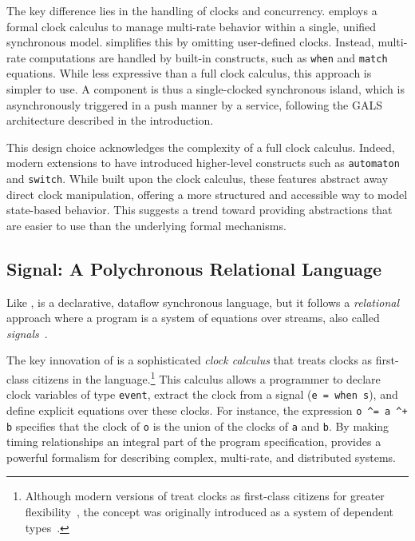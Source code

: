 The key difference lies in the handling of clocks and concurrency. \Lustre employs a formal clock
calculus to manage multi-rate behavior within a single, unified synchronous model. \GRSync
simplifies this by omitting user-defined clocks. Instead, multi-rate computations are handled by
built-in constructs, such as \texttt{when} and \texttt{match} equations. While less expressive than
a full clock calculus, this approach is simpler to use. A \GRSync component is thus a single-clocked
synchronous island, which is asynchronously triggered in a push manner by a \GRFRP service,
following the GALS architecture described in the introduction.

This design choice acknowledges the complexity of a full clock calculus. Indeed, modern extensions
to \Lustre have introduced higher-level constructs such as \texttt{automaton} and \texttt{switch}.
While built upon the clock calculus, these features abstract away direct clock manipulation,
offering a more structured and accessible way to model state-based behavior. This suggests a trend
toward providing abstractions that are easier to use than the underlying formal mechanisms.

\subsection{Signal: A Polychronous Relational Language}
\label{sec:sota:synchronous:signal}

Like \Lustre, \Signal is a declarative, dataflow synchronous language, but it follows a
\emph{relational} approach where a program is a system of equations over streams, also called
\emph{signals}~\cite{DBLP:journals/scp/BenvenisteGJ91}.

The key innovation of \Signal is a sophisticated \emph{clock calculus} that treats clocks as
first-class citizens in the language.\footnote{Although modern versions of \Lustre treat clocks as
  first-class citizens for greater flexibility~\cite{DBLP:conf/emsoft/ColacoP03}, the concept was
  originally introduced as a system of dependent types~\cite{DBLP:conf/icfp/CaspiP96}.} This
calculus allows a programmer to declare clock variables of type \texttt{event}, extract the clock
from a signal (\eg \texttt{e = when s}), and define explicit equations over these clocks. For
instance, the expression \verb|o ^= a ^+ b| specifies that the clock of \texttt{o} is the union of
the clocks of \texttt{a} and \texttt{b}. By making timing relationships an integral part of the
program specification, \Signal provides a powerful formalism for describing complex, multi-rate,
and distributed systems.

